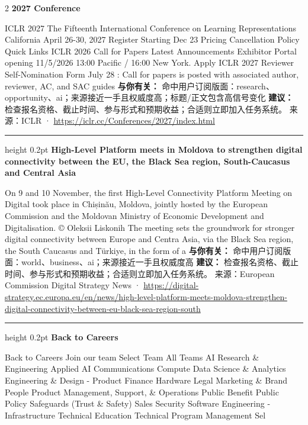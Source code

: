 \documentclass[10.5pt]{ctexart}
\begin{document}
\begin{multicols}{2}
{\large\bfseries 2027 Conference}\par
ICLR 2027 The Fifteenth International Conference on Learning Representations California April 26-30, 2027 Register Starting Dec 23 Pricing Cancellation Policy Quick Links ICLR 2026 Call for Papers Latest Announcements Exhibitor Portal opening 11/5/2026 13:00 Pacific / 16:00 New York. Apply ICLR 2027 Reviewer Self-Nomination Form July 28 : Call for papers is posted with associated author, reviewer, AC, and SAC guides 
\textbf{与你有关：} 命中用户订阅版面：research、opportunity、ai；来源接近一手且权威度高；标题/正文包含高信号变化
\textbf{建议：} 检查报名资格、截止时间、参与形式和预期收益；合适则立即加入任务系统。
{\footnotesize\color{ormuted} 来源：ICLR · \url{https://iclr.cc/Conferences/2027/index.html}}
\vspace{2mm}
\hrule height 0.2pt
\vspace{2mm}
{\large\bfseries High-Level Platform meets in Moldova to strengthen digital connectivity between the EU, the Black Sea region, South-Caucasus and Central Asia}\par
On 9 and 10 November, the first High-Level Connectivity Platform Meeting on Digital took place in Chișinău, Moldova, jointly hosted by the European Commission and the Moldovan Ministry of Economic Development and Digitalisation. © Oleksii Liskonih The meeting sets the groundwork for stronger digital connectivity between Europe and Centra Asia, via the Black Sea region, the South Caucasus and Türkiye, in the form of a
\textbf{与你有关：} 命中用户订阅版面：world、business、ai；来源接近一手且权威度高
\textbf{建议：} 检查报名资格、截止时间、参与形式和预期收益；合适则立即加入任务系统。
{\footnotesize\color{ormuted} 来源：European Commission Digital Strategy News · \url{https://digital-strategy.ec.europa.eu/en/news/high-level-platform-meets-moldova-strengthen-digital-connectivity-between-eu-black-sea-region-south}}
\vspace{2mm}
\hrule height 0.2pt
\vspace{2mm}
{\large\bfseries Back to Careers}\par
Back to Careers Join our team Select Team All Teams AI Research \& Engineering Applied AI Communications Compute Data Science \& Analytics Engineering \& Design - Product Finance Hardware Legal Marketing \& Brand People Product Management, Support, \& Operations Public Benefit Public Policy Safeguards (Trust \& Safety) Sales Security Software Engineering - Infrastructure Technical Education Technical Program Management Sel

\end{multicols}
\end{document}

